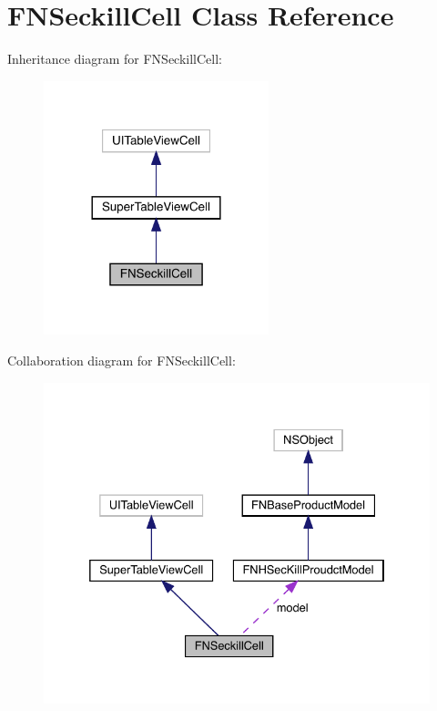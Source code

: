 \hypertarget{interface_f_n_seckill_cell}{}\section{F\+N\+Seckill\+Cell Class Reference}
\label{interface_f_n_seckill_cell}


Inheritance diagram for F\+N\+Seckill\+Cell\+:\nopagebreak
\begin{figure}[H]
\begin{center}
\leavevmode
\includegraphics[width=185pt]{interface_f_n_seckill_cell__inherit__graph}
\end{center}
\end{figure}


Collaboration diagram for F\+N\+Seckill\+Cell\+:\nopagebreak
\begin{figure}[H]
\begin{center}
\leavevmode
\includegraphics[width=332pt]{interface_f_n_seckill_cell__coll__graph}
\end{center}
\end{figure}
